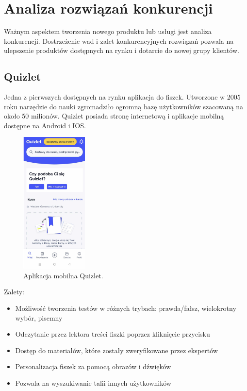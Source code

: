 \section{Analiza rozwiązań konkurencji}

Ważnym aspektem tworzenia nowego produktu lub usługi jest analiza konkurencji. Dostrzeżenie wad i zalet konkurencyjnych rozwiązań pozwala na ulepszenie produktów dostępnych na rynku i dotarcie do nowej grupy klientów.

\subsection{Quizlet}


Jedna z pierwszych dostępnych na rynku aplikacja do fiszek. Utworzone w 2005 roku narzędzie do nauki zgromadziło ogromną bazę użytkowników szacowaną na około 50 milionów. Quizlet posiada stronę internetową i aplikacje mobilną dostępne na Android i IOS.

\begin{figure}[H]
    \centering
    \includegraphics[width=0.3\textwidth]{chapters/chapter_3/quizlet.png}
    \caption{Aplikacja mobilna Quizlet.}
    \label{img:quizlet}
\end{figure}

Zalety:
\begin{itemize}
    \item Możliwość tworzenia testów w różnych trybach: prawda/fałsz, wielokrotny wybór, pisemny
    \item Odczytanie przez lektora treści fiszki poprzez kliknięcie przycisku
    \item Dostęp do materiałów, które zostały zweryfikowane przez ekspertów
    \item Personalizacja fiszek za pomocą obrazów i dźwięków
    \item Pozwala na wyszukiwanie talii innych użytkowników
\end{itemize}

